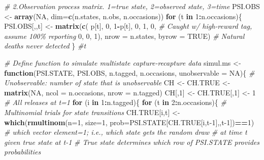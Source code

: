 \documentclass[
]{krantz}
\makeatletter
\newenvironment{Shaded}{\begin{snugshade}}{\end{snugshade}}
\newcommand{\AttributeTok}[1]{\textcolor[rgb]{0.27,0.27,0.27}{#1}}
\newcommand{\CommentTok}[1]{\textcolor[rgb]{0.37,0.37,0.37}{\textit{#1}}}
\newcommand{\ConstantTok}[1]{\textcolor[rgb]{0.37,0.37,0.37}{#1}}
\newcommand{\ControlFlowTok}[1]{\textcolor[rgb]{0.27,0.27,0.27}{\textbf{#1}}}
\newcommand{\DecValTok}[1]{\textcolor[rgb]{0.06,0.06,0.06}{#1}}
\newcommand{\FunctionTok}[1]{\textcolor[rgb]{0.27,0.27,0.27}{\textbf{#1}}}
\newcommand{\NormalTok}[1]{#1}
\newcommand{\OtherTok}[1]{\textcolor[rgb]{0.37,0.37,0.37}{#1}}
\newcommand{\SpecialCharTok}[1]{\textcolor[rgb]{0.43,0.43,0.43}{\textbf{#1}}}
\newenvironment{kframe}{%
\medskip{}
\setlength{\fboxsep}{.8em}
 \def\at@end@of@kframe{}%
 \ifinner\ifhmode%
  \def\at@end@of@kframe{\end{minipage}}%
  \begin{minipage}{\columnwidth}%
 \fi\fi%
 \def\FrameCommand##1{\hskip\@totalleftmargin \hskip-\fboxsep
 \colorbox{shadecolor}{##1}\hskip-\fboxsep
     \hskip-\linewidth \hskip-\@totalleftmargin \hskip\columnwidth}%
 \MakeFramed {\advance\hsize-\width
   \@totalleftmargin\z@ \linewidth\hsize
   \@setminipage}}%
 {\par\unskip\endMakeFramed%
 \at@end@of@kframe}
\renewenvironment{Shaded}{\begin{kframe}}{\end{kframe}}
\makeatother
\begin{document}
\begin{Shaded}
\begin{Highlighting}[]
\CommentTok{\# 2.Observation process matrix.  1=true state, 2=observed state, 3=time}
\NormalTok{PSI.OBS }\OtherTok{\textless{}{-}} \FunctionTok{array}\NormalTok{(}\ConstantTok{NA}\NormalTok{, }\AttributeTok{dim=}\FunctionTok{c}\NormalTok{(n.states, n.obs, n.occasions))}
   \ControlFlowTok{for}\NormalTok{ (t }\ControlFlowTok{in} \DecValTok{1}\SpecialCharTok{:}\NormalTok{n.occasions)\{}
\NormalTok{      PSI.OBS[,,t] }\OtherTok{\textless{}{-}} \FunctionTok{matrix}\NormalTok{(}\FunctionTok{c}\NormalTok{(}
\NormalTok{      p[t], }\DecValTok{0}\NormalTok{, }\DecValTok{1}\SpecialCharTok{{-}}\NormalTok{p[t],}
      \DecValTok{0}\NormalTok{,  }\DecValTok{1}\NormalTok{, }\DecValTok{0}\NormalTok{,  }\CommentTok{\# Caught w/ high{-}reward tag, assume 100\% reporting}
      \DecValTok{0}\NormalTok{, }\DecValTok{0}\NormalTok{, }\DecValTok{1}\NormalTok{), }\AttributeTok{nrow =}\NormalTok{ n.states, }\AttributeTok{byrow =} \ConstantTok{TRUE}\NormalTok{)  }\CommentTok{\# Natural deaths never detected}
\NormalTok{      \} }\CommentTok{\#t}

\CommentTok{\# Define function to simulate multistate capture{-}recapture data}
\NormalTok{simul.ms }\OtherTok{\textless{}{-}} \ControlFlowTok{function}\NormalTok{(PSI.STATE, PSI.OBS, n.tagged, n.occasions, }
                     \AttributeTok{unobservable =} \ConstantTok{NA}\NormalTok{)\{}
   \CommentTok{\# Unobservable: number of state that is unobservable}
\NormalTok{   CH }\OtherTok{\textless{}{-}}\NormalTok{ CH.TRUE }\OtherTok{\textless{}{-}} \FunctionTok{matrix}\NormalTok{(}\ConstantTok{NA}\NormalTok{, }\AttributeTok{ncol =}\NormalTok{ n.occasions, }\AttributeTok{nrow =}\NormalTok{ n.tagged)}
\NormalTok{   CH[,}\DecValTok{1}\NormalTok{] }\OtherTok{\textless{}{-}}\NormalTok{ CH.TRUE[,}\DecValTok{1}\NormalTok{] }\OtherTok{\textless{}{-}} \DecValTok{1} \CommentTok{\# All releases at t=1}
   \ControlFlowTok{for}\NormalTok{ (i }\ControlFlowTok{in} \DecValTok{1}\SpecialCharTok{:}\NormalTok{n.tagged)\{}
     \ControlFlowTok{for}\NormalTok{ (t }\ControlFlowTok{in} \DecValTok{2}\SpecialCharTok{:}\NormalTok{n.occasions)\{}
         \CommentTok{\# Multinomial trials for state transitions}
\NormalTok{         CH.TRUE[i,t] }\OtherTok{\textless{}{-}} \FunctionTok{which}\NormalTok{(}\FunctionTok{rmultinom}\NormalTok{(}\AttributeTok{n=}\DecValTok{1}\NormalTok{, }\AttributeTok{size=}\DecValTok{1}\NormalTok{,}
                                  \AttributeTok{prob=}\NormalTok{PSI.STATE[CH.TRUE[i,t}\DecValTok{{-}1}\NormalTok{],,t}\DecValTok{{-}1}\NormalTok{])}\SpecialCharTok{==}\DecValTok{1}\NormalTok{)}
         \CommentTok{\# which vector element=1; i.e., which state gets the random draw}
         \CommentTok{\# at time t given true state at t{-}1}
         \CommentTok{\# True state determines which row of PSI.STATE provides probabilities}


\end{Highlighting}
\end{Shaded}
\end{document}
